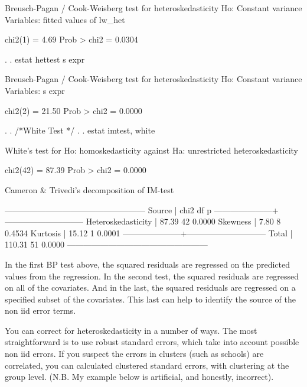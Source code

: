 \documentclass[12pt]{article}
\begin{document}
\begin{stlog}
  
Breusch-Pagan / Cook-Weisberg test for heteroskedasticity 
         Ho: Constant variance
         Variables: fitted values of lw_het

         chi2(1)      =     4.69
         Prob > chi2  =   0.0304

. 
. estat hettest s expr

Breusch-Pagan / Cook-Weisberg test for heteroskedasticity 
         Ho: Constant variance
         Variables: s expr

         chi2(2)      =    21.50
         Prob > chi2  =   0.0000

. 
. /*White Test */
.   
. estat imtest, white

White's test for Ho: homoskedasticity
         against Ha: unrestricted heteroskedasticity

         chi2(42)     =     87.39
         Prob > chi2  =    0.0000

Cameron & Trivedi's decomposition of IM-test

---------------------------------------------------
              Source |       chi2     df      p
---------------------+-----------------------------
  Heteroskedasticity |      87.39     42    0.0000
            Skewness |       7.80      8    0.4534
            Kurtosis |      15.12      1    0.0001
---------------------+-----------------------------
               Total |     110.31     51    0.0000
---------------------------------------------------


\end{stlog}


In the first BP test above, the squared residuals are regressed on the
predicted values from the regression. In the second test, the squared
residuals are regressed on all of the covariates. And in the last,
the squared residuals are regressed on a specified subset of the
covariates. This last can help to identify the source of the non iid
error terms.  

You can correct for heteroskedasticity in a number of ways. The most straightforward
is to use robust standard errors, which take into account possible non
iid errors. If you suspect the errors in clusters (such as schools)
are correlated, you can calculated clustered standard errors, with
clustering at the group level. (N.B. My example below is artificial,
and honestly, incorrect).  
\end{document}
